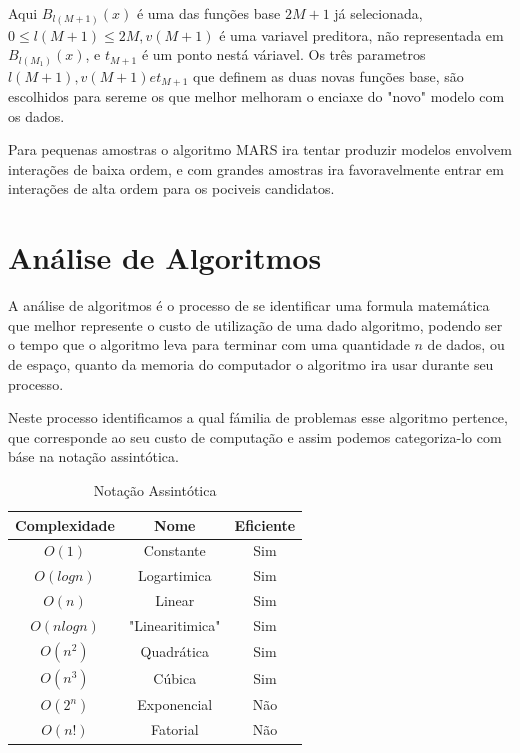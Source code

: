 \documentclass[
	12pt,				%
	openright,			%
	oneside,			%
	a4paper,			%
	english,			%
	brazil				%
	]{abntex2}
\begin{document}
Aqui $B_{l(M+1)}(x)$ é uma das funções base $2M + 1$ já selecionada, $0 \leq l(M+1) \leq 2M, v(M+1)$ é uma variavel preditora, não
representada em $B_{l(M_1)}(x)$, e $t_{M+1}$ é um ponto nestá váriavel. Os três parametros $l(M+1), v(M+1) e t_{M+1}$ que definem as
duas novas funções base, são escolhidos para sereme os que melhor melhoram o enciaxe do "novo" modelo com os dados.

Para pequenas amostras o algoritmo MARS ira tentar produzir modelos envolvem interações de baixa ordem, e com grandes amostras ira
favoravelmente entrar em interações de alta ordem para os pociveis candidatos.

\section{Análise de Algoritmos}

A análise de algoritmos é o processo de se identificar uma formula matemática que melhor represente o custo de
utilização de uma dado algoritmo, podendo ser o tempo que o algoritmo leva para terminar com uma quantidade $n$
de dados, ou de espaço, quanto da memoria do computador o algoritmo ira usar durante seu processo.

Neste processo identificamos a qual fámilia de problemas esse algoritmo pertence, que corresponde ao seu custo de
computação \cite{introductionAlgorthms} e assim podemos categoriza-lo com báse na notação assintótica.

\begin{table}[htb]
	\centering
	\caption{\label{Notação Assintótica}Notação Assintótica}
	\begin{tabular}{|c|c|c|}
	\hline
		Complexidade & Nome & Eficiente \\ \hline
		$O(1)$ & Constante & Sim \\ \hline
		$O(log n)$ & Logartimica & Sim \\ \hline
		$O(n)$ & Linear & Sim \\ \hline
		$O(n log n)$ & "Linearitimica" & Sim \\ \hline
		$O(n^2)$ & Quadrática & Sim \\ \hline
		$O(n^3)$ & Cúbica & Sim \\ \hline
		$O(2^n)$ & Exponencial & Não \\ \hline
		$O(n!)$ & Fatorial & Não \\ \hline
	\end{tabular}
\end{table}
\end{document}
